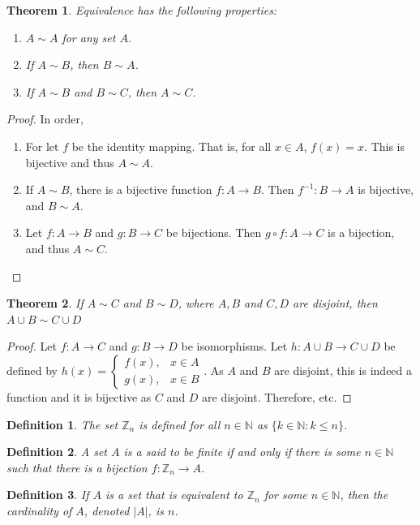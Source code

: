 \documentclass[oneside]{book}
\theoremstyle{mystyle}
\newtheorem{theorem}{Theorem}[section]
\newtheorem{definition}{Definition}[section]
\begin{document}
\begin{theorem}
Equivalence has the following properties:
\begin{enumerate}
\item $A\sim A$ for any set $A$.
\item If $A\sim B$, then $B\sim A$.
\item If $A\sim B$ and $B\sim C$, then $A\sim C$.
\end{enumerate}
\end{theorem}
\begin{proof}
In order,
\begin{enumerate}
\item For let $f$ be the identity mapping. That is, for all $x\in A$, $f(x) = x$. This is bijective and thus $A\sim A$.
\item If $A\sim B$, there is a bijective function $f:A\rightarrow B$. Then $f^{-1}:B\rightarrow A$ is bijective, and $B\sim A$.
\item Let $f:A\rightarrow B$ and $g:B\rightarrow C$ be bijections. Then $g\circ f:A\rightarrow C$ is a bijection, and thus $A\sim C$.
\end{enumerate}
\end{proof}

\begin{theorem}
If $A\sim C$ and $B\sim D$, where $A,B$ and $C,D$ are disjoint, then $A\cup B \sim C\cup D$
\end{theorem}
\begin{proof}
Let $f:A\rightarrow C$ and $g:B\rightarrow D$ be isomorphisms. Let $h:A\cup B \rightarrow C\cup D$ be defined by $h(x) = \begin{cases} f(x), & x\in A\\ g(x), & x\in B\end{cases}$. As $A$ and $B$ are disjoint, this is indeed a function and it is bijective as $C$ and $D$ are disjoint. Therefore, etc.
\end{proof}

\begin{definition}
The set $\mathbb{Z}_n$ is defined for all $n\in \mathbb{N}$ as $\{k\in \mathbb{N}: k\leq n\}$.
\end{definition}

\begin{definition}
A set $A$ is a said to be finite if and only if there is some $n\in \mathbb{N}$ such that there is a bijection $f:\mathbb{Z}_n \rightarrow A$.
\end{definition}

\begin{definition}
If $A$ is a set that is equivalent to $\mathbb{Z}_n$ for some $n\in \mathbb{N}$, then the cardinality of $A$, denoted $|A|$, is $n$.
\end{definition}
\end{document}
